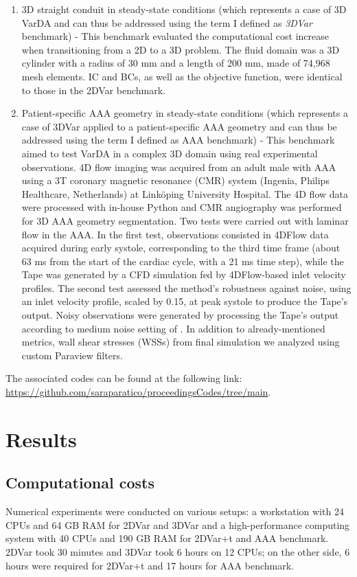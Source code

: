 \begin{enumerate}
    \item 3D straight conduit in steady-state conditions (which represents a case of 3D VarDA and can thus be addressed using the term I defined as \emph{3DVar} benchmark) - This benchmark evaluated the computational cost increase when transitioning from a 2D to a 3D problem. The fluid domain was a 3D cylinder with a radius of 30 mm and a length of 200 mm, made of 74,968 mesh elements. IC and BCs, as well as the objective function, were identical to those in the 2DVar benchmark.
    \item Patient-specific AAA geometry in steady-state conditions (which represents a case of 3DVar applied to a patient-specific AAA geometry and can thus be addressed using the term I defined as AAA benchmark) - This benchmark aimed to test VarDA in a complex 3D domain using real experimental observations. 4D flow imaging was acquired from an adult male with AAA using a 3T coronary magnetic resonance (CMR) system (Ingenia, Philips Healthcare, Netherlands) at Linköping University Hospital. The 4D flow data were processed with in-house Python \citep{Saitta2024} and CMR angiography was performed for 3D AAA geometry segmentation.
Two tests were carried out with laminar flow in the AAA. In the first test, observations consisted in 4DFlow data acquired during early systole, corresponding to the third time frame (about 63 ms from the start of the cardiac cycle, with a 21 ms time step), while the Tape was generated by a CFD simulation fed by 4DFlow-based inlet velocity profiles. The second test assessed the method's robustness against noise, using an inlet velocity profile, scaled by 0.15, at peak systole to produce the Tape's output. Noisy observations were generated by processing the Tape's output according to medium noise setting of \cite{Saitta2024}.
In addition to already-mentioned metrics, wall shear stresses (WSSs) from final simulation we analyzed using custom Paraview filters.
\end{enumerate}

The associated codes can be found at the following link:
\textcolor{blue}{\url{https://github.com/saraparatico/proceedingsCodes/tree/main}.}

\section*{Results}
\label{sec:Results}
\label{ch:chapter_three}

\subsection*{Computational costs}
Numerical experiments were conducted on various setups: a workstation with 24 CPUs and 64 GB RAM for 2DVar and 3DVar and a high-performance computing system with 40 CPUs and 190 GB RAM for 2DVar+t and AAA benchmark. 2DVar took 30 minutes and 3DVar took 6 hours on 12 CPUs; on the other side, 6 hours were required for 2DVar+t and 17 hours for AAA benchmark.


